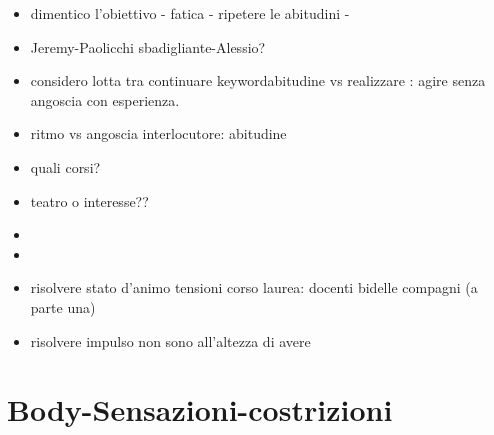 \begin{itemize}

\item dimentico l'obiettivo - fatica - ripetere le abitudini - 

\item Jeremy-Paolicchi sbadigliante-Alessio?

\item considero lotta tra continuare keyword{abitudine} vs realizzare : agire senza angoscia con esperienza.

\item ritmo vs angoscia interlocutore: abitudine 

\item quali corsi?

\item teatro  o interesse??

\item {}

\item {}

\item risolvere stato d'animo tensioni corso laurea: docenti bidelle compagni (a parte una)

\item risolvere impulso non sono all'altezza di avere 

\end{itemize}


\section{Body-Sensazioni-costrizioni}


